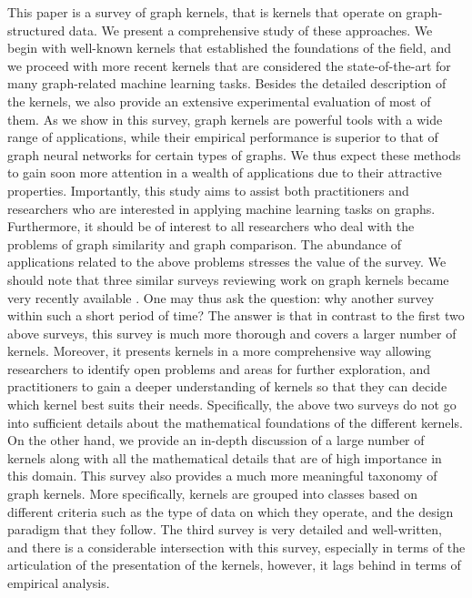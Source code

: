 \documentclass[twoside,11pt]{article}
\begin{document}
This paper is a survey of graph kernels, that is kernels that operate on graph-structured data.
We present a comprehensive study of these approaches.
We begin with well-known kernels that established the foundations of the field, and we proceed with more recent kernels that are considered the state-of-the-art for many graph-related machine learning tasks.
Besides the detailed description of the kernels, we also provide an extensive experimental evaluation of most of them.
As we show in this survey, graph kernels are powerful tools with a wide range of applications, while their empirical performance is superior to that of graph neural networks for certain types of graphs.
We thus expect these methods to gain soon more attention in a wealth of applications due to their attractive properties.
Importantly, this study aims to assist both practitioners and researchers who are interested in applying machine learning tasks on graphs.
Furthermore, it should be of interest to all researchers who deal with the problems of graph similarity and graph comparison.
The abundance of applications related to the above problems stresses the value of the survey.
We should note that three similar surveys reviewing work on graph kernels became very recently available .
One may thus ask the question: why another survey within such a short period of time?
The answer is that in contrast to the first two above surveys, this survey is much more thorough and covers a larger number of kernels.
Moreover, it presents kernels in a more comprehensive way allowing researchers to identify open problems and areas for further exploration, and practitioners to gain a deeper understanding of kernels so that they can decide which kernel best suits their needs.
Specifically, the above two surveys do not go into sufficient details about the mathematical foundations of the different kernels.
On the other hand, we provide an in-depth discussion of a large number of kernels along with all the mathematical details that are of high importance in this domain.
This survey also provides a much more meaningful taxonomy of graph kernels.
More specifically, kernels are grouped into classes based on different criteria such as the type of data on which they operate, and the design paradigm that they follow.
The third survey  is very detailed and well-written, and there is a considerable intersection with this survey, especially in terms of the articulation of the presentation of the kernels, however, it lags behind in terms of empirical analysis.
\end{document}
